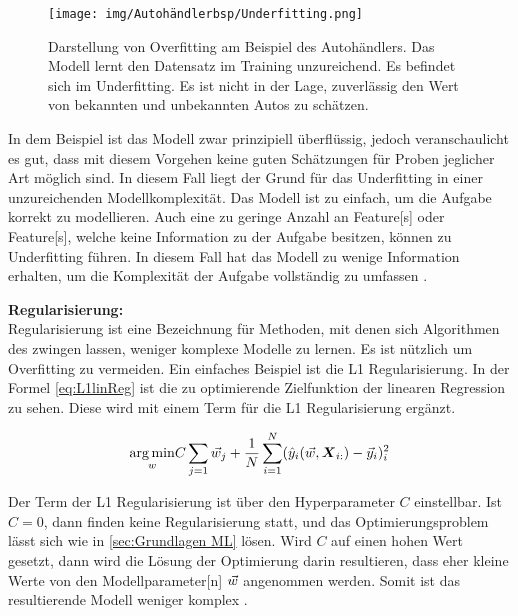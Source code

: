 \begin{figure}[htb]
    \centering
    \texttt{[image: img/Autohändlerbsp/Underfitting.png]}
    \caption[Darstellung von Underfitting am Beispiel des Autohändlers.]{Darstellung von Overfitting am Beispiel des Autohändlers. Das Modell lernt den Datensatz im Training unzureichend. Es befindet sich im Underfitting. Es ist nicht in der Lage, zuverlässig den Wert von bekannten und unbekannten Autos zu schätzen.}
    \label{fig:BspUnderfitting}
\end{figure}

In dem Beispiel ist das Modell zwar prinzipiell überflüssig, jedoch veranschaulicht es gut, dass mit diesem Vorgehen keine guten Schätzungen für Proben jeglicher Art möglich sind. In diesem Fall liegt der Grund für das \gls{Underfitting} in einer unzureichenden Modellkomplexität. Das Modell ist zu einfach, um die Aufgabe korrekt zu modellieren. Auch eine zu geringe Anzahl an \gls{Feature}[s] oder \gls{Feature}[s], welche keine Information zu der Aufgabe besitzen, können zu \gls{Underfitting} führen. In diesem Fall hat das Modell zu wenige Information erhalten, um die Komplexität der Aufgabe vollständig zu umfassen \cite{Burkov.2019, Bishop.2006, Goodfellow.2016}.  \dubpar

\textbf{\gls{Regularisierung}:}\\
\gls{Regularisierung} ist eine Bezeichnung für Methoden, mit denen sich Algorithmen des  zwingen lassen, weniger komplexe Modelle zu lernen. Es ist nützlich um \gls{Overfitting} zu vermeiden. Ein einfaches Beispiel ist die L1 \gls{Regularisierung}. In der Formel \ref{eq:L1linReg} ist die zu optimierende \gls{Zielfunktion} der linearen Regression zu sehen. Diese wird mit einem Term für die L1 \gls{Regularisierung} ergänzt.

\begin{equation}
    \label{eq:L1linReg}
    \underset{w}{\arg\min} C\sum_{j=1}\vec{w}_j + \frac{1}{N} \sum_{i=1}^{N} (\hat{y}_i(\vec{w}, \boldsymbol{X}_{i:}) - \vec{y}_i)_i^2
\end{equation}

Der Term der L1 \gls{Regularisierung} ist über den \gls{Hyperparameter} \(C\) einstellbar. Ist \(C=0\), dann finden keine \gls{Regularisierung} statt, und das Optimierungsproblem lässt sich wie in \autoref{sec:Grundlagen ML} lösen. Wird \(C\) auf einen hohen Wert gesetzt, dann wird die Lösung der Optimierung darin resultieren, dass eher kleine Werte von den  \gls{Modellparameter}[n] \(\vec{w}\) angenommen werden. Somit ist das resultierende Modell weniger komplex \cite{Burkov.2019}. \dubpar

